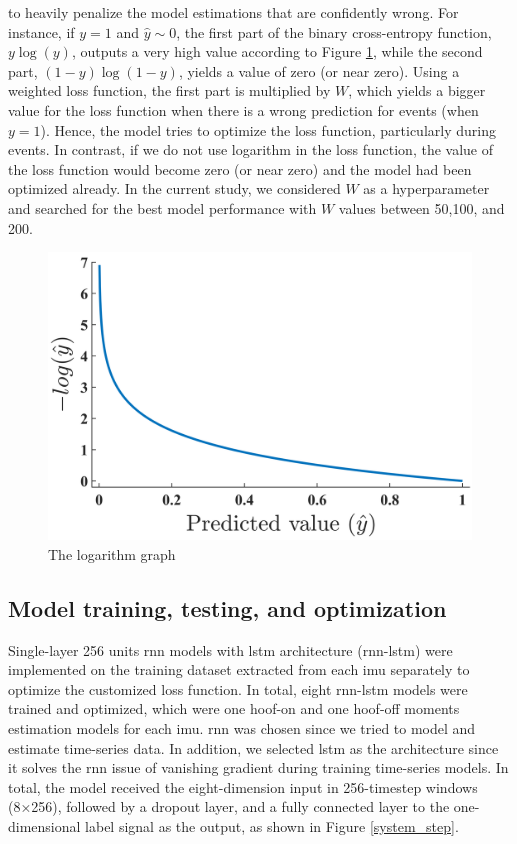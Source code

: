 \noindent to heavily penalize the model estimations that are confidently wrong. For instance, if $y = 1$ and $\hat{y}\sim 0$, the first part of the binary cross-entropy function, $y\log(y)$, outputs a very high value according to Figure \ref{log_step}, while the second part, $(1-y)\log(1-y)$, yields a value of zero (or near zero). Using a weighted loss function, the first part is multiplied by $W$, which yields a bigger value for the loss function when there is a wrong prediction for events (when $y = 1$). Hence, the model tries to optimize the loss function, particularly during events. In contrast, if we do not use logarithm in the loss function, the value of the loss function would become zero (or near zero) and the model had been optimized already. In the current study, we considered $W$ as a hyperparameter and searched for the best model performance with $W$ values between 50,100, and 200.

\begin{figure}[htbp]
\centering
\includegraphics[width=.6\linewidth]{chapters/Step/figures/20210330_log.png}
\caption{The logarithm graph}
\label{log_step}
\end{figure}


\subsection{Model training, testing, and optimization}
Single-layer 256 units \gls{rnn} models with \gls{lstm} architecture (\gls{rnn}-\gls{lstm}) were implemented on the training dataset extracted from each \gls{imu} separately to optimize the customized loss function. In total, eight \gls{rnn}-\gls{lstm} models were trained and optimized, which were one hoof-on and one hoof-off moments estimation models for each \gls{imu}. \gls{rnn} was chosen since we tried to model and estimate time-series data. In addition, we selected \gls{lstm} as the architecture since it solves the \gls{rnn} issue of vanishing gradient during training time-series models. In total, the model received the eight-dimension input in 256-timestep windows (8×256), followed by a dropout layer, and a fully connected layer to the one-dimensional label signal as the output, as shown in Figure \ref{system_step}.

